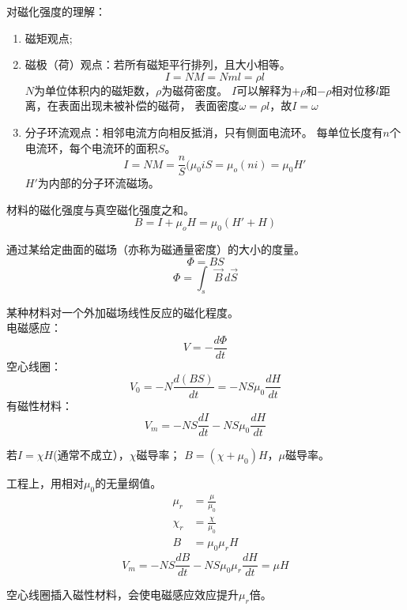 对磁化强度的理解：
\begin{enumerate}
    \item 磁矩观点;
    \item 磁极（荷）观点：若所有磁矩平行排列，且大小相等。
    \[I=NM=Nml=\rho l\]
    $N$为单位体积内的磁矩数，$\rho$为磁荷密度。
    $I$可以解释为$+\rho$和$-\rho$相对位移$l$距离，在表面出现未被补偿的磁荷，
    表面密度$\omega=\rho l$，故$I=\omega$
    
    \item 分子环流观点：相邻电流方向相反抵消，只有侧面电流环。
    每单位长度有$n$个电流环，每个电流环的面积$S$。
    \[I=NM=\frac{n}{S}(\mu_0iS=\mu_o(ni)=\mu_0H'\]
    $H'$为内部的分子环流磁场。
\end{enumerate}

\begin{definition}[磁通密度]
    材料的磁化强度与真空磁化强度之和。
    \[B=I+\mu_oH=\mu_0(H'+H)\]
\end{definition}

\begin{definition}[磁通量]
    通过某给定曲面的磁场（亦称为磁通量密度）的大小的度量。
    \[\Phi = BS\]
    \[\Phi = \int_s\vec{B}\,d\vec{S}\]
\end{definition}

\begin{definition}[磁导率]
    某种材料对一个外加磁场线性反应的磁化程度。\\
    电磁感应：
    \[ V = -\frac{d\Phi}{dt} \]
    空心线圈：
    \[ V_0 = -N \frac{d(BS)}{dt} = -NS\mu_0 \frac{dH}{dt} \]
    有磁性材料：
    \[ V_m = -NS\frac{dI}{dt} - NS\mu_0 \frac{dH}{dt} \]
\end{definition}
\begin{remark}
    若$I = \chi H$(通常不成立），$\chi$磁导率；
    $B = (\chi + \mu_0)H$，$\mu$磁导率。
\end{remark}

工程上，用相对$\mu_0$的无量纲值。
\begin{align*}
    \mu_r &= \frac{\mu}{\mu_0} \\
    \chi_r &= \frac{\chi}{\mu_0} \\
    B &= \mu_0 \mu_r H
\end{align*}
\[ V_m = -NS\frac{dB}{dt} - NS\mu_0\mu_r \frac{dH}{dt}
    = \mu H
\]

空心线圈插入磁性材料，会使电磁感应效应提升$\mu_r$倍。



